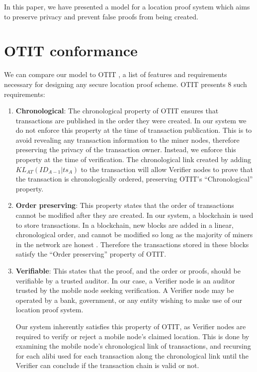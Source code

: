 In this paper, we have presented a model for a location proof system which aims to preserve privacy and prevent false proofs from being created.

\section{OTIT conformance}
We can compare our model to OTIT \cite{otit}, a list of features and requirements necessary for designing any secure location proof scheme. OTIT presents 8 such requirements:
\begin{enumerate}
\item[] \textbf{Chronological}: The chronological property of OTIT ensures that transactions are published in the order they were created. In our system we do not enforce this property at the time of transaction publication. This is to avoid revealing any transaction information to the miner nodes, therefore preserving the privacy of the transaction owner. Instead, we enforce this property at the time of verification. The chronological link created by adding $KL_{AT}(ID_{A-1}|ts_A)$ to the transaction will allow Verifier nodes to prove that the transaction is chronologically ordered, preserving OTIT's ``Chronological'' property.

\item[] \textbf{Order preserving}: This property states that the order of transactions cannot be modified after they are created. In our system, a blockchain is used to store transactions. In a blockchain, new blocks are added in a linear, chronological order, and cannot be modified so long as the majority of miners in the network are honest \cite{blueprint}. Therefore the transactions stored in these blocks satisfy the ``Order preserving'' property of OTIT. %

\item[] \textbf{Verifiable}: This states that the proof, and the order or proofs, should be verifiable by a trusted auditor. In our case, a Verifier node is an auditor trusted by the mobile node seeking verification. A Verifier node may be operated by a bank, government, or any entity wishing to make use of our location proof system.

Our system inherently satisfies this property of OTIT, as Verifier nodes are required to verify or reject a mobile node's claimed location. This is done by examining the mobile node's chronological link of transactions, and recursing for each alibi used for each transaction along the chronological link until the Verifier can conclude if the transaction chain is valid or not.


\end{enumerate}
